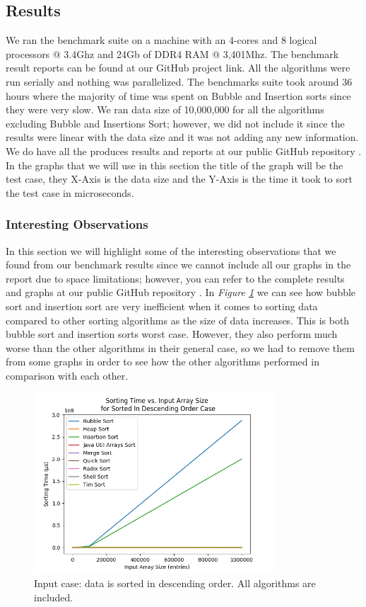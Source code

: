 \subsection{Results}

We ran the benchmark suite on a machine with an 4-cores and 8 logical processors @ 3.4Ghz and 24Gb of DDR4 RAM @ 3,401Mhz. The benchmark result reports can be found at our GitHub project link\cite{GitHubProjectURL}. All the algorithms were run serially and nothing was parallelized. The benchmarks suite took around 36 hours where the majority of time was spent on Bubble and Insertion sorts since they were very slow. We ran data size of 10,000,000 for all the algorithms excluding Bubble and Insertions Sort; however, we did not include it since the results were linear with the data size and it was not adding any new information. We do have all the produces results and reports at our public GitHub repository \cite{GitHubProjectURL}. In the graphs that we will use in this section the title of the graph will be the test case, they X-Axis is the data size and the Y-Axis is the time it took to sort the test case in microseconds.

\subsubsection{Interesting Observations}

In this section we will highlight some of the interesting observations that we found from our benchmark results since we cannot include all our graphs in the report due to space limitations; however, you can refer to the complete results and graphs at our public GitHub repository \cite{GitHubProjectURL}. In \textit{Figure \ref{fig:allInDescendingOrder}} we can see how bubble sort and insertion sort are very inefficient when it comes to sorting data compared to other sorting algorithms as the size of data increases. This is both bubble sort and insertion sorts worst case. However, they also perform much worse than the other algorithms in their general case, so we had to remove them from some graphs in order to see how the other algorithms performed in comparison with each other.

\begin{figure}[!ht]
\centering
\includegraphics[width=9cm]{figures/plots_all_algs/sorting_time_vs_input_array_size_SortedInDescendingOrderCase.png}
\caption{Input case: data is sorted in descending order. All algorithms are included.}
\label{fig:allInDescendingOrder}
\end{figure}

